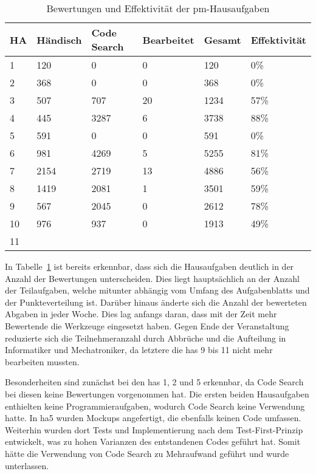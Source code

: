 \begin{table}
    \centering
    \caption{Bewertungen und Effektivität der \ac{pm}-Hausaufgaben}
    \begin{tabular}{|l|l|l|l|l|l|}
    \hline
        HA  & Händisch & Code Search & Bearbeitet & Gesamt & Effektivität  \\ \hline
        1   & 120  & 0    & 0  & 120  &  0\%  \\ \hline
        2   & 368  & 0    & 0  & 368  &  0\%  \\ \hline
        3   & 507  & 707  & 20 & 1234 & 57\%  \\ \hline
        4   & 445  & 3287 & 6  & 3738 & 88\%  \\ \hline
        5   & 591  & 0    & 0  & 591  &  0\%  \\ \hline
        6   & 981  & 4269 & 5  & 5255 & 81\%  \\ \hline
        7   & 2154 & 2719 & 13 & 4886 & 56\%  \\ \hline
        8   & 1419 & 2081 & 1  & 3501 & 59\%  \\ \hline
        9   & 567  & 2045 & 0  & 2612 & 78\%  \\ \hline
        10  & 976  & 937  & 0  & 1913 & 49\%  \\ \hline
        11  & \multicolumn{5}{c}{\todo{}}  \\ \hline
    \end{tabular}
    \label{tbl:pm-effectiveness}
\end{table}

In Tabelle~\ref{tbl:pm-effectiveness} ist bereits erkennbar, dass sich die Hausaufgaben deutlich in der Anzahl der Bewertungen unterscheiden.
Dies liegt hauptsächlich an der Anzahl der Teilaufgaben, welche mitunter abhängig vom Umfang des Aufgabenblatts und der Punkteverteilung ist.
Darüber hinaus änderte sich die Anzahl der bewerteten Abgaben in jeder Woche.
Dies lag anfangs daran, dass mit der Zeit mehr Bewertende die Werkzeuge eingesetzt haben.
Gegen Ende der Veranstaltung reduzierte sich die Teilnehmeranzahl durch Abbrüche und die Aufteilung in Informatiker und Mechatroniker, da letztere die \acp{ha} 9 bis 11 nicht mehr bearbeiten mussten.

Besonderheiten sind zunächst bei den \acp{ha} 1, 2 und 5 erkennbar, da Code Search bei diesen keine Bewertungen vorgenommen hat.
Die ersten beiden Hausaufgaben enthielten keine Programmieraufgaben, wodurch Code Search keine Verwendung hatte.
In \ac{ha}5 wurden Mockups angefertigt, die ebenfalls keinen Code umfassen.
Weiterhin wurden dort Tests und Implementierung nach dem Test-First-Prinzip entwickelt, was zu hohen Varianzen des entstandenen Codes geführt hat.
Somit hätte die Verwendung von Code Search zu Mehraufwand geführt und wurde unterlassen.


